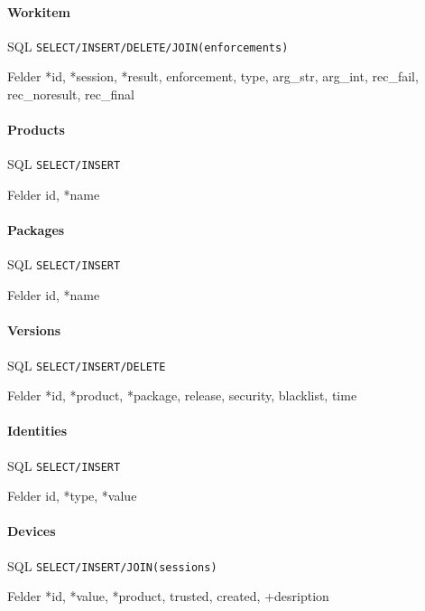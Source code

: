 \documentclass[10pt,a4paper]{scrartcl}
\begin{document}
\paragraph{Workitem}
\begin{description*}
	\item[SQL] \texttt{SELECT/INSERT/DELETE/JOIN(enforcements)}
	\item[Felder] *id, *session, *result, enforcement, type, arg\_str, arg\_int, rec\_fail, rec\_noresult, rec\_final
\end{description*} 
 
\paragraph{Products}
\begin{description*}
	\item[SQL] \texttt{SELECT/INSERT}
	\item[Felder] id, *name
\end{description*}

\paragraph{Packages}
\begin{description*}
	\item[SQL] \texttt{SELECT/INSERT}
	\item[Felder] id, *name
\end{description*}

\paragraph{Versions}
\begin{description*}
	\item[SQL] \texttt{SELECT/INSERT/DELETE}
	\item[Felder] *id, *product, *package, release, security, blacklist, time
\end{description*}

\paragraph{Identities}
\begin{description*}
	\item[SQL] \texttt{SELECT/INSERT}
	\item[Felder] id, *type, *value
\end{description*}

\paragraph{Devices}
\begin{description*}
	\item[SQL] \texttt{SELECT/INSERT/JOIN(sessions)}
	\item[Felder] *id, *value, *product, trusted, created, +desription
\end{description*}
\end{document}
